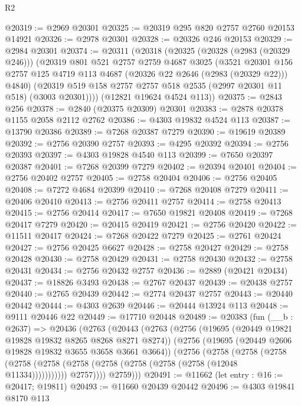 \begin{lexlean}{R2}
\begin{coremodule}
@20319 := @2969 @20301
@20325 := @20319 @295 @820 @2757 @2760 @20153 @14921
@20326 := @2978 @20301
@20328 := @20326 @246 @20153
@20329 := @2984 @20301
@20374 := @20311
    (@20318
      (@20325
        (@20328 (@2983 (@20329 @246)))
        (@20319
          @801
          @521
          @2757
          @2759
          @4687
          @3025
          (@3521
            @20301
            @156
            @2757
            @125
            @4719
            @113
            @4687
            (@20326 @22 @2646 (@2983 (@20329 @22)))
            @4840)
          (@20319 @519 @158 @2757 @2757 @518 @2535 (@2997 @20301 @11 @518) (@3003 @20301))))
      (@12821 @19624 @4524 @113))
@20375 := @2843 @256
@20378 := @2840 (@20375 @20309) @20301
@20383 := @2878 @20378 @1155 @2058 @2112 @2762
@20386 := @4303 @19832 @4524 @113
@20387 := @13790 @20386
@20389 := @7268 @20387 @7279
@20390 := @19619 @20389
@20392 := @2756 @20390 @2757
@20393 := @4295 @20392
@20394 := @2756 @20393
@20397 := @4303 @19828 @4540 @113
@20399 := @7650 @20397 @20387
@20401 := @7268 @20399 @7279
@20402 := @20394 @20401
@20404 := @2756 @20402 @2757
@20405 := @2758 @20404
@20406 := @2756 @20405
@20408 := @7272 @4684 @20399
@20410 := @7268 @20408 @7279
@20411 := @20406 @20410
@20413 := @2756 @20411 @2757
@20414 := @2758 @20413
@20415 := @2756 @20414
@20417 := @7650 @19821 @20408
@20419 := @7268 @20417 @7279
@20420 := @20415 @20419
@20421 := @2756 @20420
@20422 := @11511 @20417
@20424 := @7268 @20422 @7279
@20425 := @2761 @20424
@20427 := @2756 @20425 @6627
@20428 := @2758 @20427
@20429 := @2758 @20428
@20430 := @2758 @20429
@20431 := @2758 @20430
@20432 := @2758 @20431
@20434 := @2756 @20432 @2757
@20436 := @2889 (@20421 @20434)
@20437 := @18826 @3493
@20438 := @2767 @20437
@20439 := @20438 @2757
@20440 := @2765 @20439
@20442 := @2774 @20437 @2757
@20443 := @20440 @20442
@20444 := @4303 @2639
@20446 := @20444 @13924 @113
@20448 := @9111 @20446 @22
@20449 := @17710 @20448
@20489 := @20383
    (fun (__b : @2637) =>
    @20436
      (@2763
        (@20443
          (@2763
            (@2756
              (@19695 (@20449 @19821 @19828 @19832 @8265 @8268 @8271 @8274))
              (@2756
                (@19695 (@20449 @2606 @19828 @19832 @3655 @3658 @3661 @3664))
                (@2756
                  (@2758
                    (@2758
                      (@2758
                        (@2758 (@2758 (@2758 (@2758 (@2758 (@2758 (@2758 (@12048 @11334)))))))))))
                  @2757))))
          @2759)))
@20491 := @11662 (let entry : @16 := @20417; @19811)
@20493 := @11660 @20439 @20442
@20496 := @4303 @19841 @8170 @113

\end{coremodule}
\end{lexlean}
